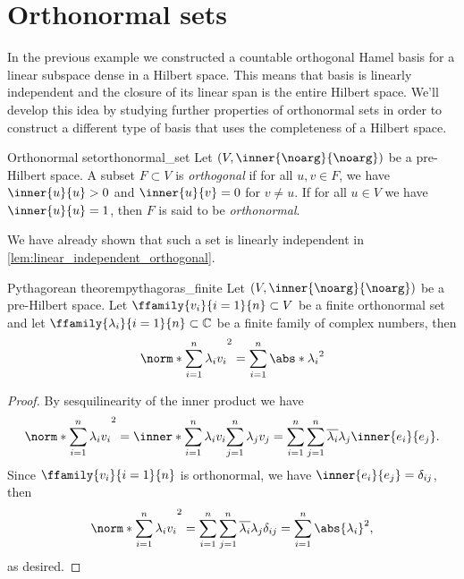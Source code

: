 \section{Orthonormal sets}
In the previous example we constructed a countable orthogonal Hamel basis for a linear subspace dense in a Hilbert space. This means that basis is linearly independent and the closure of its linear span is the entire Hilbert space. We'll develop this idea by studying further properties of orthonormal sets in order to construct a different type of basis that uses the completeness of a Hilbert space.
\begin{definition}{Orthonormal set}{orthonormal_set}
    Let \((V, \inner{\noarg}{\noarg})\) be a pre-Hilbert space. A subset \(F\subset V\) is \emph{orthogonal} if for all \(u, v \in F\), we have \(\inner{u}{u} > 0\) and \(\inner{u}{v} = 0\) for \(v \neq u\). If for all \(u \in V\) we have \(\inner{u}{u} = 1\), then \(F\) is said to be \emph{orthonormal}.
\end{definition}
\begin{remark}
    We have already shown that such a set is linearly independent in \cref{lem:linear_independent_orthogonal}.
\end{remark}

\begin{lemma}{Pythagorean theorem}{pythagoras_finite}
    Let \((V, \inner{\noarg}{\noarg})\) be a pre-Hilbert space. Let \(\ffamily{v_i}{i = 1}{n} \subset V\) be a finite orthonormal set and let \(\ffamily{\lambda_i}{i=1}{n} \subset \mathbb{C}\) be a finite family of complex numbers, then
    \begin{equation*}
        \norm*{\sum_{i = 1}^n \lambda_i v_i}^2 = \sum_{i=1}^n \abs*{\lambda_i}^2
    \end{equation*}
\end{lemma}
\begin{proof}
    By sesquilinearity of the inner product we have
    \begin{equation*}
        \norm*{\sum_{i = 1}^n \lambda_i v_i}^2 = \inner*{\sum_{i = 1}^n \lambda_i v_i}{\sum_{j = 1}^n \lambda_j v_j} = \sum_{i = 1}^n \sum_{j = 1}^n \conj{\lambda_i} \lambda_j \inner{e_i}{e_j}.
    \end{equation*}
    Since \(\ffamily{v_i}{i=1}{n}\) is orthonormal, we have \(\inner{e_i}{e_j} = \delta_{ij}\), then
    \begin{equation*}
        \norm*{\sum_{i=1}^n\lambda_i v_i}^2 = \sum_{i = 1}^n \sum_{j=1}^n \conj{\lambda_i}\lambda_j \delta_{ij} = \sum_{i = 1}^n \abs{\lambda_i}^2,
    \end{equation*}
    as desired.
\end{proof}

